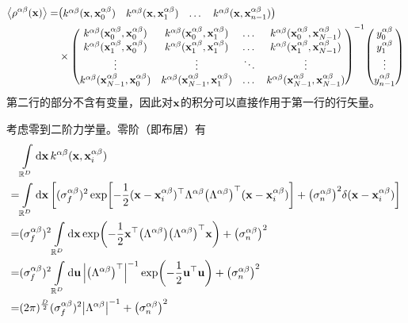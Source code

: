 \documentclass[12pt,UTF8]{article}
\begin{document}
			\begin{align}
                \ev{\rho^{\alpha\beta}(\vb{x})}=&\mqty(k^{\alpha\beta}(\vb{x},\vb{x}_{0}^{\alpha\beta}) & k^{\alpha\beta}(\vb{x},\vb{x}_{1}^{\alpha\beta}) & \dots & k^{\alpha\beta}(\vb{x},\vb{x}_{n-1}^{\alpha\beta})) \nonumber \\
                &\times\mqty(k^{\alpha\beta}(\vb{x}_0^{\alpha\beta},\vb{x}_0^{\alpha\beta}) & k^{\alpha\beta}(\vb{x}_0^{\alpha\beta},\vb{x}_1^{\alpha\beta}) & \dots & k^{\alpha\beta}(\vb{x}_0^{\alpha\beta},\vb{x}_{N-1}^{\alpha\beta}) \\
                k^{\alpha\beta}(\vb{x}_1^{\alpha\beta},\vb{x}_0^{\alpha\beta}) & k^{\alpha\beta}(\vb{x}_1^{\alpha\beta},\vb{x}_1^{\alpha\beta}) & \dots & k^{\alpha\beta}(\vb{x}_1^{\alpha\beta},\vb{x}_{N-1}^{\alpha\beta}) \\
                \vdots & \vdots & \ddots & \vdots \\
                k^{\alpha\beta}(\vb{x}_{N-1}^{\alpha\beta},\vb{x}_0^{\alpha\beta}) & k^{\alpha\beta}(\vb{x}_{N-1}^{\alpha\beta},\vb{x}_1^{\alpha\beta}) & \dots & k^{\alpha\beta}(\vb{x}_{N-1}^{\alpha\beta},\vb{x}_{N-1}^{\alpha\beta}))^{-1}\mqty(y^{\alpha\beta}_0 \\ y^{\alpha\beta}_1 \\ \vdots \\ y^{\alpha\beta}_{n-1})
            \end{align}
            第二行的部分不含有变量，因此对$\vb{x}$的积分可以直接作用于第一行的行矢量。\par
            考虑零到二阶力学量。零阶（即布居）有
			\begin{align}
                &\int\limits_{\mathbb{R}^D}{\dd{\vb{x}}k^{\alpha\beta}(\vb{x},\vb{x}_i^{\alpha\beta})} \nonumber \\
                =&\int\limits_{\mathbb{R}^D}{\dd{\vb{x}}\qty[(\sigma_f^{\alpha\beta})^2\exp[-\frac{1}{2}(\vb{x}-\vb{x}_i^{\alpha\beta})^\top\Lambda^{\alpha\beta}\qty(\Lambda^{\alpha\beta})^\top(\vb{x}-\vb{x}_i^{\alpha\beta})]+\qty(\sigma_n^{\alpha\beta})^2\delta(\vb{x}-\vb{x}_i^{\alpha\beta})]} \\
                =&(\sigma_f^{\alpha\beta})^2\int\limits_{\mathbb{R}^D}{\dd{\vb{x}}\exp(-\frac{1}{2}\vb{x}^\top\qty(\Lambda^{\alpha\beta})\qty(\Lambda^{\alpha\beta})^\top\vb{x})}+\qty(\sigma_n^{\alpha\beta})^2 \\
                =&(\sigma_f^{\alpha\beta})^2\int\limits_{\mathbb{R}^D}{\dd{\vb{u}}\abs{\qty(\Lambda^{\alpha\beta})^\top}^{-1}\exp(-\frac{1}{2}\vb{u}^\top\vb{u})}+\qty(\sigma_n^{\alpha\beta})^2 \\
                =&(2\pi)^{\frac{D}{2}}(\sigma_f^{\alpha\beta})^2\abs{\Lambda^{\alpha\beta}}^{-1}+\qty(\sigma_n^{\alpha\beta})^2
            \end{align}
\end{document}
